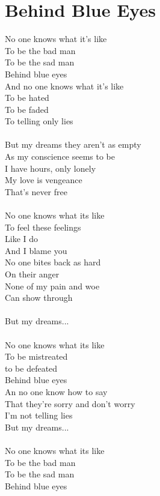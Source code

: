 \section{Behind Blue Eyes}
No one knows what it's like\\
To be the bad man\\
To be the sad man\\
Behind blue eyes\\
And no one knows what it's like\\
To be hated\\
To be faded\\
To telling only lies\\
\\
But my dreams they aren't as empty\\
As my conscience seems to be\\
I have hours, only lonely\\
My love is vengeance\\
That's never free\\
\\
No one knows what its like\\
To feel these feelings\\
Like I do\\
And I blame you\\
No one bites back as hard\\
On their anger\\
None of my pain and woe\\
Can show through\\
\\
But my dreams...\\
\\
No one knows what its like\\
To be mistreated\\
to be defeated\\
Behind blue eyes\\
An no one know how to say\\
That they're sorry and don't worry\\
I'm not telling lies\\
But my dreams...\\
\\
No one knows what its like\\
To be the bad man\\
To be the sad man\\
Behind blue eyes
